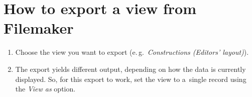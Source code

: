 \documentclass[12pt,a4paper]{scrartcl}
\begin{document}
\section{How to export a view from Filemaker}%
\label{sec:howto}

\begin{enumerate}
  \item
    Choose the view you want to export
    (e.\,g.\ \emph{Constructions (Editors' layout)}).\\[1ex]{}

  \item
    The export yields different output, depending on how the data is currently
    displayed.
    So, for this export to work, set the view to a~single record using the
    \emph{View as} option.\\[1ex]{}


\end{enumerate}
\end{document}
